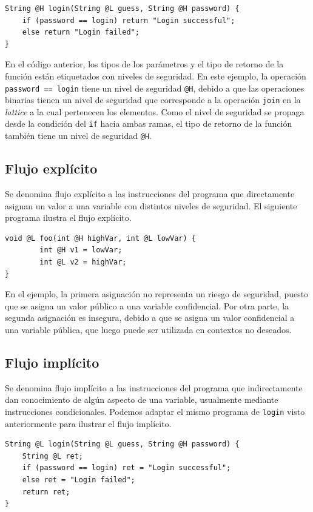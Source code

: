 	\begin{lstlisting}
String @H login(String @L guess, String @H password) {
	if (password == login) return "Login successful";
	else return "Login failed";
}
	\end{lstlisting}

	En el código anterior, los tipos de los parámetros y el tipo de retorno de la función están etiquetados con niveles de seguridad. En este ejemplo, la operación \texttt{password == login} tiene un nivel de seguridad \texttt{@H}, debido a que las operaciones binarias tienen un nivel de seguridad que corresponde a la operación \texttt{join} en la \textit{lattice} a la cual pertenecen los elementos. Como el nivel de seguridad se propaga desde la condición del \texttt{if} hacia ambas ramas, el tipo de retorno de la función también tiene un nivel de seguridad \texttt{@H}.

	\subsection{Flujo explícito}
	Se denomina flujo explícito a las instrucciones del programa que directamente asignan un valor a una variable con distintos niveles de seguridad. El siguiente programa ilustra el flujo explícito.

	\begin{lstlisting}
void @L foo(int @H highVar, int @L lowVar) {
		int @H v1 = lowVar;
		int @L v2 = highVar;
}
	\end{lstlisting}

	En el ejemplo, la primera asignación no representa un riesgo de seguridad, puesto que se asigna un valor público a una variable confidencial. Por otra parte, la segunda asignación es insegura, debido a que se asigna un valor confidencial a una variable pública, que luego puede ser utilizada en contextos no deseados.

	\subsection{Flujo implícito}

	Se denomina flujo implícito a las instrucciones del programa que indirectamente dan conocimiento de algún aspecto de una variable, usualmente mediante instrucciones condicionales. Podemos adaptar el mismo programa de \texttt{login} visto anteriormente para ilustrar el flujo implícito.

	\begin{lstlisting}
String @L login(String @L guess, String @H password) {
	String @L ret;
	if (password == login) ret = "Login successful";
	else ret = "Login failed";
	return ret;
}
	\end{lstlisting}


